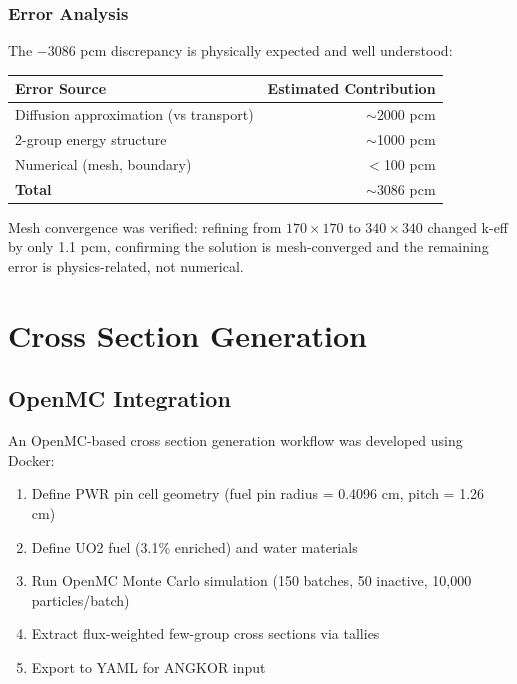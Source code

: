 \documentclass[12pt,a4paper]{article}
\begin{document}
\subsubsection{Error Analysis}

The $-3086$ pcm discrepancy is physically expected and well understood:

\begin{center}
\begin{tabular}{lr}
\toprule
\textbf{Error Source} & \textbf{Estimated Contribution} \\
\midrule
Diffusion approximation (vs transport) & $\sim$2000 pcm \\
2-group energy structure & $\sim$1000 pcm \\
Numerical (mesh, boundary) & $<$100 pcm \\
\midrule
\textbf{Total} & $\sim$3086 pcm \\
\bottomrule
\end{tabular}
\end{center}

Mesh convergence was verified: refining from $170\times170$ to $340\times340$
changed k-eff by only 1.1 pcm, confirming the solution is mesh-converged and
the remaining error is physics-related, not numerical.

\section{Cross Section Generation}

\subsection{OpenMC Integration}

An OpenMC-based cross section generation workflow was developed using Docker:

\begin{enumerate}
    \item Define PWR pin cell geometry (fuel pin radius = 0.4096 cm,
          pitch = 1.26 cm)
    \item Define UO2 fuel (3.1\% enriched) and water materials
    \item Run OpenMC Monte Carlo simulation (150 batches, 50 inactive,
          10,000 particles/batch)
    \item Extract flux-weighted few-group cross sections via tallies
    \item Export to YAML for ANGKOR input
\end{enumerate}
\end{document}
